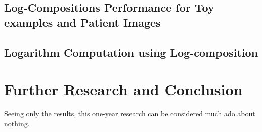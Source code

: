 \subsection{Log-Compositions Performance for Toy examples and Patient Images}


\subsection{Logarithm Computation using Log-composition}





\section{Further Research and Conclusion}\label{ch:conclusions}


Seeing only the results, this one-year research can be considered much ado about nothing. 
